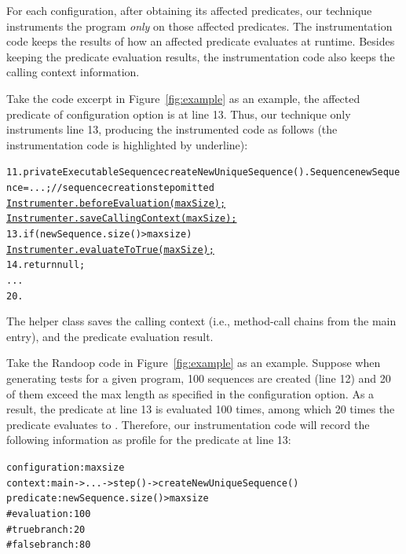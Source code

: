 For each configuration, after obtaining its affected predicates, our technique
instruments the program \textit{only} on those affected predicates. The instrumentation
code keeps the results of how an affected predicate evaluates at runtime. Besides keeping
the predicate evaluation results, the instrumentation code also keeps
the calling context information.

Take the code excerpt in Figure~\ref{fig:example} as an example, the affected
predicate of configuration option  is at line 13. Thus, our technique
only instruments line 13, producing the instrumented
code as follows (the instrumentation code is highlighted by underline):


\begin{CodeOut}
\begin{alltt}
11. private ExecutableSequence createNewUniqueSequence() .   Sequence newSequence = ...; //sequence creation step omitted
      \underline{Instrumenter.beforeEvaluation(maxSize);}
      \underline{Instrumenter.saveCallingContext(maxSize);}
13.   if (newSequence.size() > maxsize) \ttlcb
        \underline{Instrumenter.evaluateToTrue(maxSize);}
14.     return null;
      ...
20. \ttrcb
\end{alltt}
\end{CodeOut}

The helper class  saves the calling context (i.e.,
method-call chains from the main entry), and the predicate evaluation result.

Take the Randoop code in Figure~\ref{fig:example} as an example. Suppose when
generating tests for a given program, 100 sequences are created (line 12) and 20
of them exceed the max length as specified in the  configuration option.
As a result, the predicate at line 13 is evaluated 100 times, among which 20 times the
predicate evaluates to . Therefore,
our instrumentation code will record the following information as profile for the predicate
at line 13:


\begin{CodeOut}
\begin{alltt}
configuration: maxsize
context: main -> ... -> step() - > createNewUniqueSequence()
predicate: newSequence.size() > maxsize
    \# evaluation: 100
    \# true branch: 20
    \# false branch: 80
\end{alltt}
\end{CodeOut}

